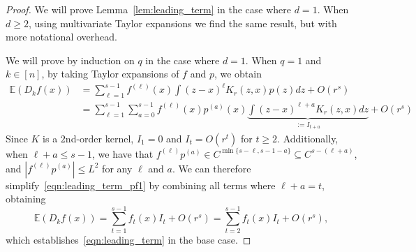 \documentclass{article}
\newcommand{\abs}[1]{\left \lvert #1 \right \rvert}
\newcommand{\1}{\mathbf{1}}
\newcommand{\Ebb}{\mathbb{E}}
\theoremstyle{alden}
\theoremstyle{aldenthm}
\theoremstyle{definition}
\theoremstyle{remark}
\begin{document}
\begin{proof}
	We will prove Lemma~\ref{lem:leading_term} in the case where $d = 1$. When $d \geq 2$, using multivariate Taylor expansions we find the same result, but with more notational overhead. 
	
	We will prove by induction on $q$ in the case where $d = 1$. When $q = 1$ and $k \in [n]$, by taking Taylor expansions of $f$ and $p$, we obtain
	\begin{align}
	\nonumber 
	\Ebb(D_kf(x)) & = \sum_{\ell = 1}^{s - 1} f^{(\ell)}(x) \int (z - x)^{\ell} K_r(z,x) p(z) dz + O(r^s) \\ 
	& = \sum_{\ell = 1}^{s - 1} \sum_{a = 0}^{s - 1} f^{(\ell)}(x) p^{(a)}(x) \underbrace{\int(z - x)^{\ell + a} K_r(z,x) dz}_{:=I_{t + a}} + O(r^s) \label{eqn:leading_term_pf1}
	\end{align}
	Since $K$ is a $2$nd-order kernel, $I_{1} = 0$ and $I_t = O(r^{t})$ for $t \geq 2$.  Additionally, when $\ell + a \leq s - 1$, we have that $f^{(\ell)}p^{(a)} \in C^{\min\{s - \ell, s - 1 - a\}} \subseteq C^{s - (\ell + a)}$, and $\abs{f^{(\ell)}p^{(a)}} \leq L^2$ for any $\ell$ and $a$. We can therefore simplify~\eqref{eqn:leading_term_pf1} by combining all terms where $\ell + a = t$, obtaining
	\begin{equation}
	\label{eqn:leading_term_pf2}
	\Ebb(D_kf(x)) = \sum_{t = 1}^{s - 1} f_t(x) I_t + O(r^s) = \sum_{t = 2}^{s - 1} f_t(x) I_t + O(r^s),
	\end{equation}
	which establishes~\eqref{eqn:leading_term} in the base case.
	

\end{proof}
\end{document}
